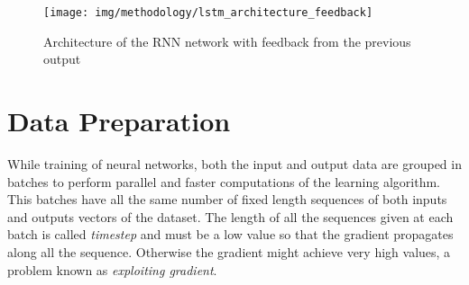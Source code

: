 
\begin{figure}[H]
\begin{center}
\texttt{[image: img/methodology/lstm\_architecture\_feedback]}
\end{center}
\caption{Architecture of the RNN network with feedback from the previous output}
\label{fig:lstm_architecture_feedback}
\end{figure}





\section{Data Preparation}

While training of neural networks, both the input and output data are grouped in batches to perform parallel and faster computations of the learning algorithm. This batches have all the same number of fixed length sequences of both inputs and outputs vectors of the dataset.
The length of all the sequences given at each batch is called \textit{timestep} and must be a low value so that the gradient propagates along all the sequence. Otherwise the gradient might achieve very high values, a problem known as \textit{exploiting gradient}.

